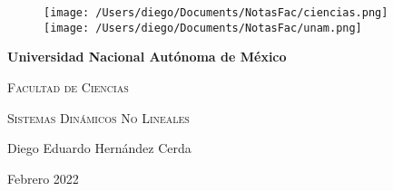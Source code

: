 \begin{titlepage}
 \thispagestyle{empty}
  
  \begin{figure}[ht]
      \texttt{[image: /Users/diego/Documents/NotasFac/ciencias.png]}
      \label{EscudoUNAM}
     \endminipage
      \texttt{[image: /Users/diego/Documents/NotasFac/unam.png]}
      \label{EscudoFC}
    \endminipage
  \end{figure}
  

\centering
\vspace{1cm}
\centering
{\bfseries\huge Universidad Nacional Autónoma de México \par}
\vspace{2cm}
{\scshape\huge Facultad de Ciencias \par}
\vspace{3cm}
{\scshape\LARGE Sistemas Dinámicos No Lineales \par}
\vspace{3cm}
{\LARGE Diego Eduardo Hernández Cerda \par}
\vspace{3cm}
{\LARGE Febrero 2022 \par}
\end{titlepage}
